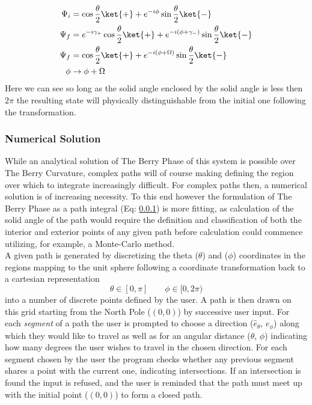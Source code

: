 \documentclass{article}
\begin{document}
\begin{align*}
  \Psi_i &= \cos \frac{\theta}{2} \ket{+} + e^{-i\phi}\sin \frac{\theta}{2}\ket{-}\\
  \Psi_f &= e^{-i\gamma_{+}}\cos \frac{\theta}{2} \ket{+} + e^{-i(\phi + \gamma_{-})}\sin \frac{\theta}{2}\ket{-}\\
  \Psi_f &= \cos \frac{\theta}{2} \ket{+} + e^{-i(\phi + \Omega)}\sin \frac{\theta}{2}\ket{-}\\
  \phi &\rightarrow \phi + \Omega
\end{align*}
Here we can see so long as the solid angle enclosed by the solid angle is less then $2\pi$ the resulting state will physically distinguishable from the initial one following the transformation.\\

\subsubsection{Numerical Solution}

While an analytical solution of The Berry Phase of this system is possible over The Berry Curvature, complex paths will of course making defining the region over which to integrate increasingly difficult. For complex paths then, a numerical solution is of increasing necessity. To this end however the formulation of The Berry Phase as a path integral (Eq: \ref{}) is more fitting, as calculation of the solid angle of the path would require the definition and classification of both the interior and exterior points of any given path before calculation could commence utilizing, for example, a Monte-Carlo method.\\

A given path is generated by discretizing the theta ($\theta$) and ($\phi$) coordinates in the regions mapping to the unit sphere following a coordinate transformation back to a cartesian representation
\begin{equation*}
  \theta \in [0, \pi]  \qquad  \phi \in [0, 2\pi)
\end{equation*}
into a number of discrete points defined by the user. A path is then drawn on this grid starting from the North Pole ($(0,0)$) by successive user input. For each \textit{segment} of a path the user is prompted to choose a direction ($\hat{e}_{\theta}$, $e_{\phi}$) along which they would like to travel as well as for an angular distance ($\theta$, $\phi$) indicating how many degrees the user wishes to travel in the chosen direction. For each segment chosen by the user the program checks whether any previous segment shares a point with the current one, indicating intersections. If an intersection is found the input is refused, and the user is reminded that the path must meet up with the initial point ($(0,0)$) to form a closed path.\\
\end{document}
